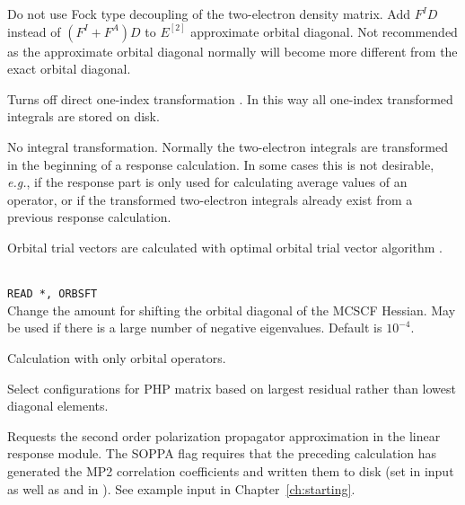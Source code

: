 \begin{description}
\item{}
Do not use Fock type decoupling of the two-electron density matrix.
Add $F^ID$ instead of $(F^I+F^A)D$ to $E^{[2]}$ approximate
orbital diagonal. Not recommended as the approximate orbital diagonal
normally will become more different from the exact orbital diagonal.

\item{}
Turns off direct one-index transformation \cite{ovhahjajjcc15}.
In this way all one-index transformed integrals are stored on disk.

\item{}
No integral transformation. Normally the two-electron integrals are
transformed in the beginning of a response calculation. In some cases
this is not desirable, {\it e.g.\/}, if the response part is only used for
calculating average values of an operator, or if the transformed two-electron
integrals already exist from a previous response calculation.

\item{}
Orbital trial vectors are calculated with optimal orbital
trial vector
algorithm \cite{tuhjahjajpjjcp84}.

\item{}\\
\verb|READ *, ORBSFT|\\
Change the amount for shifting the orbital
diagonal of the MCSCF Hessian.
May be used if there is a large number of negative eigenvalues.
Default is $10^{-4}$.

\item{}
Calculation with only orbital operators.

\item{}
Select configurations for PHP matrix based on largest residual
rather than lowest diagonal elements.


\item{}
Requests the second order polarization propagator approximation
in the linear response module.
The SOPPA
flag requires that
the preceding {\sir} calculation has generated the MP2 correlation
coefficients and written them to disk (set  in 
input as well as  and  in ). See
example input in Chapter~\ref{ch:starting}.


\end{description}
